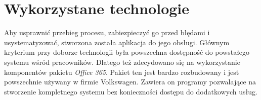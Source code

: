 \section{Wykorzystane technologie}
Aby usprawnić przebieg procesu, zabiezpieczyć go przed błędami i usystematyzować, stworzona została aplikacja do jego obsługi. Głównym kryterium przy doborze technologii była powszechna dostępność do powstałego systemu wśród pracowników. Dlatego też zdecydowano się na wykorzystanie komponentów pakietu \emph{Office 365}. Pakiet ten jest bardzo rozbudowany i jest powszechnie używany w firmie Volkswagen. Zawiera on programy pozwalające na stworzenie kompletnego systemu bez konieczności dostępu do dodatkowych usług.